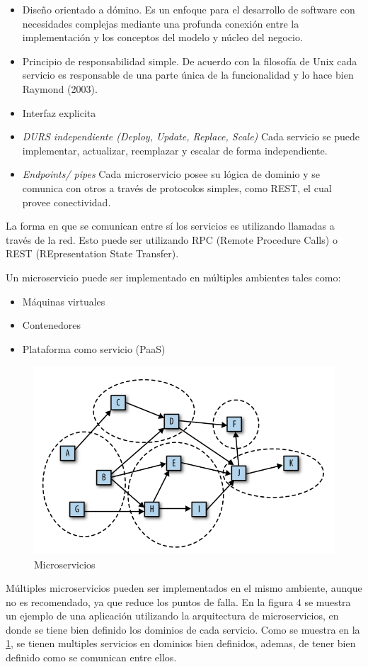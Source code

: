 \documentclass[12pt,twoside]{reedthesis}
\providecommand{\tightlist}{%
  \setlength{\itemsep}{0pt}\setlength{\parskip}{0pt}}
\begin{document}
\begin{itemize}
\tightlist
\item
  Diseño orientado a dómino. Es un enfoque para el desarrollo de software con necesidades complejas mediante una profunda conexión entre la implementación y los conceptos del modelo y núcleo del negocio.
\item
  Principio de responsabilidad simple. De acuerdo con la filosofía de Unix cada servicio es responsable de una parte única de la funcionalidad y lo hace bien Raymond (2003).
\item
  Interfaz explicita
\item
  \emph{DURS independiente (Deploy, Update, Replace, Scale)} Cada servicio se puede implementar, actualizar, reemplazar y escalar de forma independiente.
\item
  \emph{Endpoints/ pipes} Cada microservicio posee su lógica de dominio y se comunica con otros a través de protocolos simples, como REST, el cual provee conectividad.
\end{itemize}
La forma en que se comunican entre sí los servicios es utilizando llamadas a través de la red. Esto puede ser utilizando RPC (Remote Procedure Calls) o REST (REpresentation State Transfer).

Un microservicio puede ser implementado en múltiples ambientes tales como:
\begin{itemize}
\tightlist
\item
  Máquinas virtuales
\item
  Contenedores
\item
  Plataforma como servicio (PaaS)
\end{itemize}
\begin{figure}[h!]
  \centering
  \includegraphics[scale=0.5]{./figure/Cap3/monoFig2.png}
  \caption{Microservicios}\label{figura2}
\end{figure}
Múltiples microservicios pueden ser implementados en el mismo ambiente, aunque no es recomendado, ya que reduce los puntos de falla. En la figura 4 se muestra un ejemplo de una aplicación utilizando la arquitectura de microservicios, en donde se tiene bien definido los dominios de cada servicio. Como se muestra en la \ref{figura2}, se tienen multiples servicios en dominios bien definidos, ademas, de tener bien definido como se comunican entre ellos.
\end{document}
